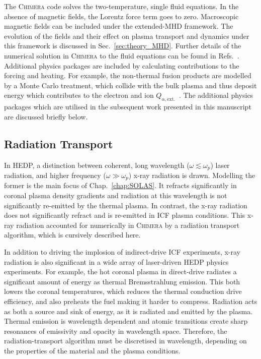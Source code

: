 The \textsc{Chimera} code solves the two-temperature, single fluid equations.
In the absence of magnetic fields, the Lorentz force term goes to zero.
Macroscopic magnetic fields can be included under the extended-\ac{MHD} framework.
The evolution of the fields and their effect on plasma transport and dynamics under this framework is discussed in Sec.~\ref{sec:theory_MHD}.
Further details of the numerical solution in \textsc{Chimera} to the fluid equations can be found in Refs.~\cite{chittenden_signatures_2016,walsh_extended_2018,crilly_simulation_2020,farrow_extended_2023,oneill_modelling_2023,chaturvedi_simulating_2024}. 
Additional physics packages are included by calculating contributions to the forcing and heating.
For example, the non-thermal fusion products are modelled by a Monte Carlo treatment, which collide with the bulk plasma and thus deposit energy which contributes to the electron and ion $Q_{\alpha,\text{ext.}}$~\cite{tong_burn_2019}.
The additional physics packages which are utilised in the subsequent work presented in this manuscript are discussed briefly below.

\subsection{Radiation Transport}%
\label{sec:theory_radtransp}

In \ac{HEDP}, a distinction between coherent, long wavelength ($\omega \lesssim \omega_p$) laser radiation, and higher frequency ($\omega \gg \omega_p$) x-ray radiation is drawn.
Modelling the former is the main focus of Chap.~\ref{chap:SOLAS}.
It refracts significantly in coronal plasma density gradients and radiation at this wavelength is not significantly re-emitted by the thermal plasma.
In contrast, the x-ray radiation does not significantly refract and is re-emitted in \ac{ICF} plasma conditions.
This x-ray radiation accounted for numerically in \textsc{Chimera} by a radiation transport algorithm, which is cursively described here.

In addition to driving the implosion of indirect-drive \ac{ICF} experiments, x-ray radiation is also significant in a wide array of laser-driven \ac{HEDP} physics experiments.
For example, the hot coronal plasma in direct-drive radiates a significant amount of energy as thermal Bremsstrahlung emission.
This both lowers the coronal temperatures, which reduces the thermal conduction drive efficiency, and also preheats the fuel making it harder to compress.
Radiation acts as both a source and sink of energy, as it is radiated and emitted by the plasma.
Thermal emission is wavelength dependent and atomic transitions create sharp resonances of emissivity and opacity in wavelength space.
Therefore, the radiation-transport algorithm must be discretised in wavelength, depending on the properties of the material and the plasma conditions.

